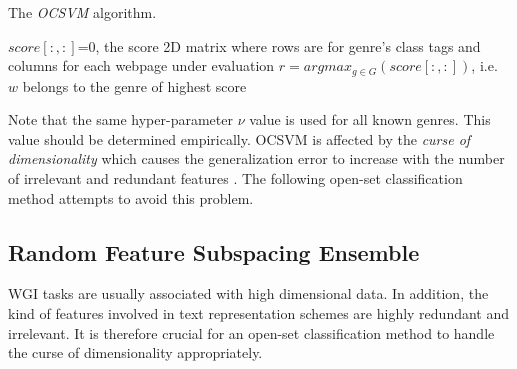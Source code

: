 \begin{algorithm}[t]
\caption{The \textit{OCSVM} algorithm.}\label{chap:openset:sec:alg:OCSVM_Ensemble}
$score[:, :]$=0, the score 2D matrix where rows are for genre's class tags and columns for each webpage under evaluation
{
        $r = argmax_{g \in G}(score[:, :])$, i.e. $w$ belongs to the genre of highest score\;
    }
\end{algorithm}

\hfill

Note that the same hyper-parameter $\nu$ value is used for all known genres. This value should be determined empirically. OCSVM is affected by the \textit{curse of dimensionality} which causes the generalization error to increase with the number of irrelevant and redundant features . The following open-set classification method attempts to avoid this problem.


\subsection{Random Feature Subspacing Ensemble}\label{chap:openset:sec:RFSE_Description}

WGI tasks are usually associated with high dimensional data. In addition, the kind of features involved in text representation schemes are highly redundant and irrelevant. It is therefore crucial for an open-set classification method to handle the curse of dimensionality appropriately.

